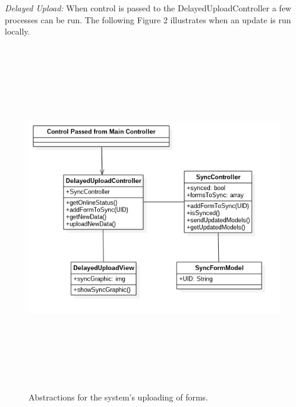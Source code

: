 \documentclass[twoside,letterpaper]{article}
\begin{document}
\newpage
\noindent\textit{Delayed Upload:}
\newline
When control is passed to the DelayedUploadController a few processes can be run. The following Figure 2 illustrates when an update is run locally. 


\begin{figure}[H]
\centering
\includegraphics[width=6in,height=6in]{Delayed_Upload_UML.png}
\caption{Abstractions for the system's uploading of forms.}
\end{figure}
\end{document}
